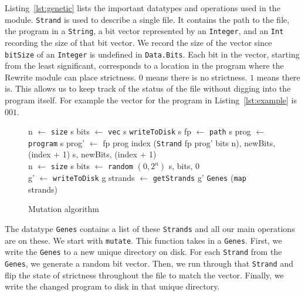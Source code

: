 \documentclass[preprint,nocopyrightspace]{sigplanconf}
\begin{document}
Listing~\ref{lst:genetic} lists the important datatypes and operations used in the module. \lstinline!Strand! is used to describe a single file. It contains the path to the file, the program in a \lstinline!String!, a bit vector represented by an \lstinline!Integer!, and an \lstinline!Int! recording the size of that bit vector. We record the size of the vector since \lstinline!bitSize! of an \lstinline!Integer! is undefined in \lstinline!Data.Bits!. Each bit in the vector, starting from the least significant, corresponds to a location in the program where the Rewrite module can place strictness. $0$ means there is no strictness. $1$ means there is. This allows us to keep track of the status of the file without digging into the program itself. For example the vector for the program in Listing~\ref{lst:example} is $001$. 

\begin{figure}[t]
\begin{algorithmic}
\State n $\gets$ \lstinline!size! s
\State bits $\gets$ \lstinline!vec! s
    \Return \lstinline!writeToDisk! s
    \State fp $\gets$ \lstinline{path} s
    \State prog $\gets$ \lstinline{program} s
    \State prog' $\gets$  {fp prog index}
    \State \Return {} {(\lstinline!Strand! fp prog' bits n), newBits, (index + 1)}
\Else 
\State\Return{} {s, newBits, (index + 1)}
\EndIf
\EndFunction\\
\State n $\gets$ \lstinline!size! s
\State bits $\gets$ \lstinline!random! $(0, 2^n)$
\State\Return{} {s, bits, 0}
\EndFunction\\
\State g' $\gets$ \lstinline!writeToDisk! g
\State strands $\gets$ \lstinline!getStrands! g'
\State\Return \lstinline!Genes! (\lstinline!map!  strands)
\EndFunction
\end{algorithmic}
\caption{Mutation algorithm}
\label{alg:mutate}
\end{figure}

The datatype \lstinline!Genes! contains a list of these \lstinline!Strands! and all our main operations are on these. We start with \lstinline!mutate!. This function takes in a \lstinline!Genes!. First, we write the \lstinline!Genes! to a new unique directory on disk. For each \lstinline!Strand! from the \lstinline!Genes!, we generate a random bit vector. Then, we run through that \lstinline!Strand! and flip the state of strictness throughout the file to match the vector. Finally, we write the changed program to disk in that unique directory.
\end{document}
